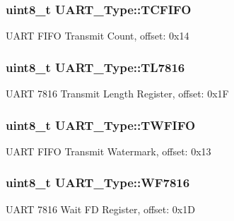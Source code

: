 \subsubsection[{\texorpdfstring{T\+C\+F\+I\+FO}{TCFIFO}}]{ uint8\+\_\+t U\+A\+R\+T\+\_\+\+Type\+::\+T\+C\+F\+I\+FO}\hypertarget{structUART__Type_a84b8e4511219e743ccd3308ac0290572}{}\label{structUART__Type_a84b8e4511219e743ccd3308ac0290572}
U\+A\+RT F\+I\+FO Transmit Count, offset\+: 0x14 
\subsubsection[{\texorpdfstring{T\+L7816}{TL7816}}]{ uint8\+\_\+t U\+A\+R\+T\+\_\+\+Type\+::\+T\+L7816}\hypertarget{structUART__Type_ac13e6db552f61befb71ea95d93af7dee}{}\label{structUART__Type_ac13e6db552f61befb71ea95d93af7dee}
U\+A\+RT 7816 Transmit Length Register, offset\+: 0x1F 
\subsubsection[{\texorpdfstring{T\+W\+F\+I\+FO}{TWFIFO}}]{ uint8\+\_\+t U\+A\+R\+T\+\_\+\+Type\+::\+T\+W\+F\+I\+FO}\hypertarget{structUART__Type_a7ab7656c715ebc0ab2632f35903f2a42}{}\label{structUART__Type_a7ab7656c715ebc0ab2632f35903f2a42}
U\+A\+RT F\+I\+FO Transmit Watermark, offset\+: 0x13 
\subsubsection[{\texorpdfstring{W\+F7816}{WF7816}}]{ uint8\+\_\+t U\+A\+R\+T\+\_\+\+Type\+::\+W\+F7816}\hypertarget{structUART__Type_a5fc0251bba4980051f8991db62e18c2a}{}\label{structUART__Type_a5fc0251bba4980051f8991db62e18c2a}
U\+A\+RT 7816 Wait FD Register, offset\+: 0x1D 
